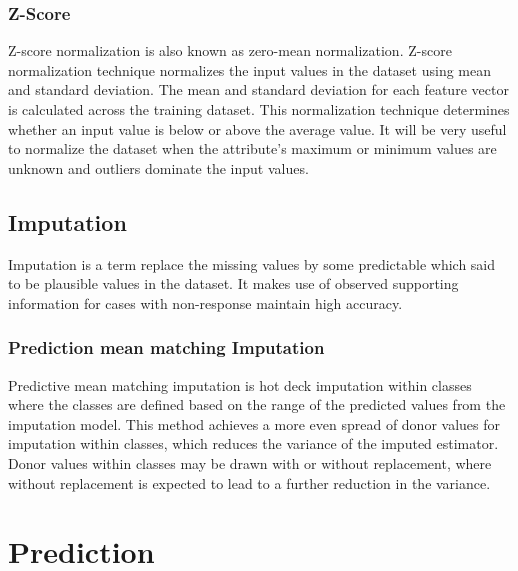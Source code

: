 \subsubsection{Z-Score}
Z-score normalization is also known as zero-mean normalization. Z-score normalization
technique normalizes the input values in the dataset using mean and standard deviation.
The mean and standard deviation for each feature vector is calculated across the training dataset. This normalization technique determines whether an input value is below
or above the average value. It will be very useful to normalize the dataset when the
attribute’s maximum or minimum values are unknown and outliers dominate the input
values.	
\subsection{Imputation}
Imputation is a term replace the missing values by some predictable which said to be
plausible values in the dataset. It makes use of observed supporting information for cases
with non-response maintain high accuracy.
\subsubsection{Prediction mean matching Imputation}
Predictive mean matching imputation is hot deck imputation within classes where the
classes are defined based on the range of the predicted values from the imputation model.
This method achieves a more even spread of donor values for imputation within classes,
which reduces the variance of the imputed estimator. Donor values within classes may
be drawn with or without replacement, where without replacement is expected to lead to
a further reduction in the variance.
\section{Prediction}

